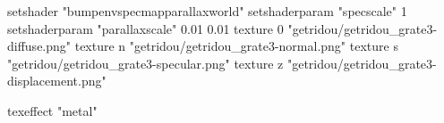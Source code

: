 setshader "bumpenvspecmapparallaxworld"
setshaderparam "specscale" 1
setshaderparam "parallaxscale" 0.01 0.01
texture 0 "getridou/getridou_grate3-diffuse.png"
texture n "getridou/getridou_grate3-normal.png"
texture s "getridou/getridou_grate3-specular.png"
texture z "getridou/getridou_grate3-displacement.png"

texeffect "metal"
